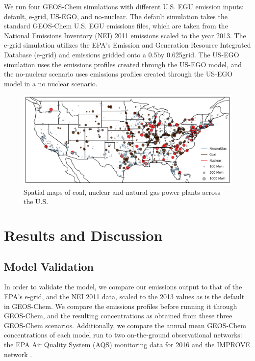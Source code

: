 \documentclass[12]{article}
\begin{document}
We run four GEOS-Chem simulations with different U.S. EGU emission inputs: default, e-grid, US-EGO, and no-nuclear. The default simulation takes the standard GEOS-Chem U.S. EGU emissions files, which are taken from the National Emissions Inventory (NEI) 2011 emissions scaled to the year 2013. The e-grid simulation utilizes the EPA's Emission and Generation Resource Integrated Database (e-grid) \citep{epa_emissions_2016}  and  emissions gridded onto a 0.5\degree by 0.625\degree grid. The US-EGO simulation uses the emissions profiles created through the US-EGO model, and the no-nuclear scenario uses emissions profiles created through the US-EGO model in a no nuclear scenario. 

\begin{figure}
    \centering
    \includegraphics[scale=0.4]{ego_nonuclear_project/Figures/plants_normal.png}
    \caption{Spatial maps of coal, nuclear and natural gas power plants across the U.S.} 
    \label{fig:plants}
\end{figure}

\section{Results and Discussion}
\subsection{Model Validation}

In order to validate the model, we compare our emissions output to that of the EPA's e-grid, and the NEI 2011 data, scaled to the 2013 values as is the default in GEOS-Chem. We compare the emissions profiles before running it through GEOS-Chem, and the resulting concentrations as obtained from these three GEOS-Chem scenarios. Additionally, we compare the annual mean GEOS-Chem concentrations of each model run to two on-the-ground observational networks: the EPA Air Quality System (AQS) monitoring data for 2016 \citep{us_epa_daily_2016} and the IMPROVE network \citep{malm_spatial_1994}. 
\end{document}
